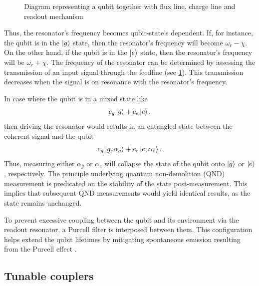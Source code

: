 \begin{figure}
    \centering
    
    \vspace{-1cm}
    \caption{Diagram representing a qubit together with flux line, charge line and readout mechanism}
    \label{fig:diagram_storage_qubit}
\end{figure}

Thus, the resonator's frequency becomes qubit-state's dependent.
If, for instance, the qubit is in the $\ket{g}$ state, then the resonator's frequency will become $\omega_r - \chi$.
On the other hand, if the qubit is in the $\ket{e}$ state, then the resonator's frequency will be $\omega_r + \chi$.
The frequency of the resonator can be determined by assessing the transmission of an input signal through the feedline (see \cref{fig:diagram_storage_qubit}).
This transmission decreases when the signal is on resonance with the resonator's frequency.

In case where the qubit is in a mixed state like
\begin{equation}
    c_g \ket{g} + c_e \ket{e} ,
\end{equation}
then driving the resonator would results in an entangled state between the coherent signal and the qubit
\begin{equation}
    c_g \ket{g, \alpha_g} + c_e \ket{e, \alpha_e} .
\end{equation}
Thus, measuring either $\alpha_g$ or $\alpha_e$ will collapse the state of the qubit onto $\ket{g}$ or $\ket{e}$, respectively.
The principle underlying quantum non-demolition (QND) measurement is predicated on the stability of the state post-measurement.
This implies that subsequent QND measurements would yield identical results, as the state remains unchanged.

To prevent excessive coupling between the qubit and its environment via the readout resonator, a Purcell filter is interposed between them.
This configuration helps extend the qubit lifetimes by mitigating spontaneous emission resulting from the Purcell effect \cite{Purcell_effect}.

\subsection{Tunable couplers}

